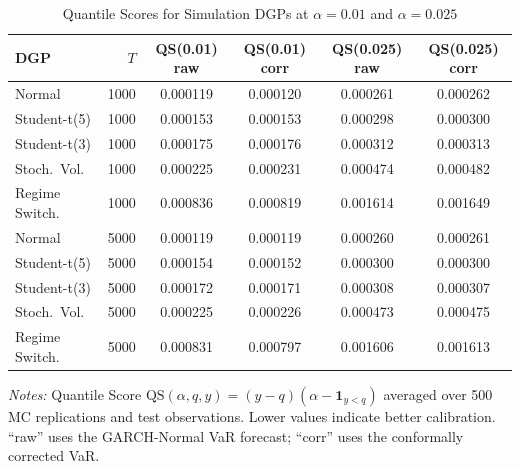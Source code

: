 \begin{table}[htbp]
\centering
\caption{Quantile Scores for Simulation DGPs at $\alpha=0.01$ and $\alpha=0.025$}
\label{tab:quantile_scores}
\scriptsize
\begin{tabular}{lrcccc}
\toprule
DGP & $T$ & QS(0.01) raw & QS(0.01) corr & QS(0.025) raw & QS(0.025) corr \\
\midrule
Normal & 1000 & 0.000119 & 0.000120 & 0.000261 & 0.000262 \\
Student-t(5) & 1000 & 0.000153 & 0.000153 & 0.000298 & 0.000300 \\
Student-t(3) & 1000 & 0.000175 & 0.000176 & 0.000312 & 0.000313 \\
Stoch.\ Vol. & 1000 & 0.000225 & 0.000231 & 0.000474 & 0.000482 \\
Regime Switch. & 1000 & 0.000836 & 0.000819 & 0.001614 & 0.001649 \\
\midrule
Normal & 5000 & 0.000119 & 0.000119 & 0.000260 & 0.000261 \\
Student-t(5) & 5000 & 0.000154 & 0.000152 & 0.000300 & 0.000300 \\
Student-t(3) & 5000 & 0.000172 & 0.000171 & 0.000308 & 0.000307 \\
Stoch.\ Vol. & 5000 & 0.000225 & 0.000226 & 0.000473 & 0.000475 \\
Regime Switch. & 5000 & 0.000831 & 0.000797 & 0.001606 & 0.001613 \\
\bottomrule
\end{tabular}
\begin{tablenotes}
\small
\item \textit{Notes:} Quantile Score $\mathrm{QS}(\alpha, q, y) = (y - q)(\alpha - \mathbf{1}_{y < q})$ averaged over 500 MC replications and test observations.
Lower values indicate better calibration. ``raw'' uses the GARCH-Normal VaR forecast; ``corr'' uses the conformally corrected VaR.
\end{tablenotes}
\end{table}
